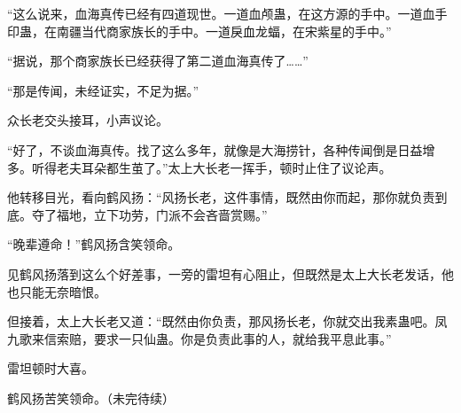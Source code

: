 \begin{this_body}
“这么说来，血海真传已经有四道现世。一道血颅蛊，在这方源的手中。一道血手印蛊，在南疆当代商家族长的手中。一道戾血龙蝠，在宋紫星的手中。”

“据说，那个商家族长已经获得了第二道血海真传了……”

“那是传闻，未经证实，不足为据。”

众长老交头接耳，小声议论。

“好了，不谈血海真传。找了这么多年，就像是大海捞针，各种传闻倒是日益增多。听得老夫耳朵都生茧了。”太上大长老一挥手，顿时止住了议论声。

他转移目光，看向鹤风扬：“风扬长老，这件事情，既然由你而起，那你就负责到底。夺了福地，立下功劳，门派不会吝啬赏赐。”

“晚辈遵命！”鹤风扬含笑领命。

见鹤风扬落到这么个好差事，一旁的雷坦有心阻止，但既然是太上大长老发话，他也只能无奈暗恨。

但接着，太上大长老又道：“既然由你负责，那风扬长老，你就交出我素蛊吧。凤九歌来信索赔，要求一只仙蛊。你是负责此事的人，就给我平息此事。”

雷坦顿时大喜。

鹤风扬苦笑领命。（未完待续）

\end{this_body}


